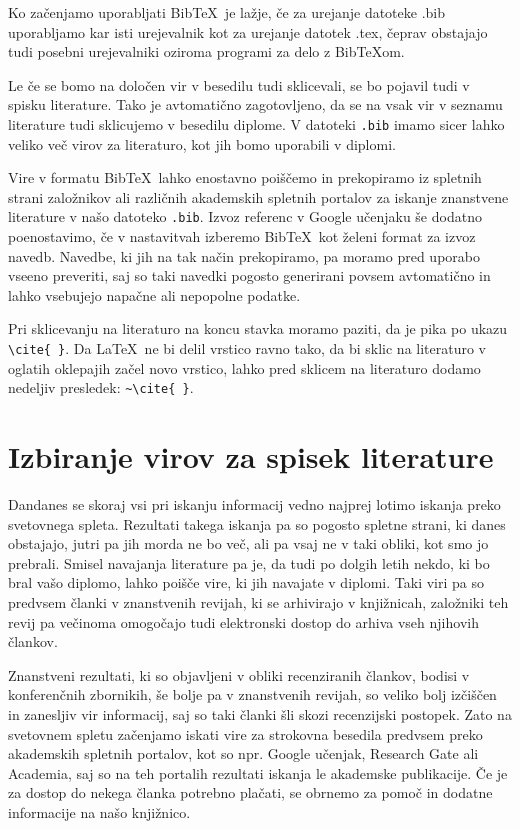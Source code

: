 \documentclass[a4paper, 12pt]{book}
\newcommand{\BibTeX}{{\sc Bib}\TeX}
\begin{document}
{{Ko začenjamo uporabljati \BibTeX\ je lažje, če za urejanje datoteke .bib uporabljamo kar isti urejevalnik kot za urejanje datotek .tex, 
čeprav obstajajo tudi posebni urejevalniki oziroma programi za delo z \BibTeX om.

Le če se bomo na določen vir v besedilu tudi sklicevali, se bo pojavil tudi v spisku literature.
Tako je avtomatično zagotovljeno, da se na vsak vir v seznamu literature tudi sklicujemo v besedilu diplome.
V datoteki \texttt{.bib} imamo sicer lahko veliko več virov za literaturo, kot jih bomo uporabili v diplomi.

Vire v formatu \BibTeX\ lahko enostavno poiščemo in prekopiramo iz spletnih strani založnikov ali različnih akademskih spletnih portalov za iskanje znanstvene literature v našo datoteko \texttt{.bib}.
Izvoz  referenc v Google učenjaku še dodatno poenostavimo, če v nastavitvah izberemo \BibTeX\ kot želeni format za izvoz navedb.
Navedbe, ki jih na tak način prekopiramo, pa moramo pred uporabo vseeno preveriti, saj so taki navedki pogosto generirani povsem avtomatično in lahko vsebujejo napačne ali nepopolne podatke.

Pri sklicevanju na literaturo na koncu stavka moramo paziti, da je pika po ukazu \verb=\cite{ }=.
Da \LaTeX\ ne bi delil vrstico ravno tako, da bi sklic na literaturo v oglatih oklepajih začel novo vrstico, lahko pred sklicem na literaturo dodamo nedeljiv presledek: \verb=~\cite{ }=.


\section{Izbiranje virov za spisek literature}

Dandanes  se skoraj  vsi pri iskanju informacij vedno najprej lotimo iskanja preko svetovnega spleta.
Rezultati takega iskanja pa so pogosto spletne strani, ki danes obstajajo, jutri pa jih morda ne bo več, ali pa vsaj ne v taki obliki, kot smo jo prebrali.
Smisel navajanja literature pa je, da tudi po dolgih letih nekdo, ki bo bral vašo diplomo, lahko poišče vire, ki jih navajate v diplomi.
Taki viri pa so predvsem članki v znanstvenih revijah, ki se arhivirajo v knjižnicah, založniki teh revij pa večinoma omogočajo tudi elektronski dostop do arhiva vseh njihovih člankov.

Znanstveni rezultati, ki so objavljeni v obliki recenziranih člankov, bodisi v konferenčnih zbornikih, še bolje pa v znanstvenih revijah, so veliko bolj izčiščen in zanesljiv vir informacij, saj
so taki članki šli skozi recenzijski postopek.
Zato na svetovnem spletu začenjamo iskati vire za strokovna besedila predvsem preko akademskih spletnih portalov, kot so npr. Google učenjak, Research Gate ali Academia, saj
so na teh portalih rezultati iskanja le akademske publikacije.
Če je za dostop do nekega članka potrebno plačati, se obrnemo za pomoč in dodatne informacije na  našo knjižnico.

}}
\end{document}

